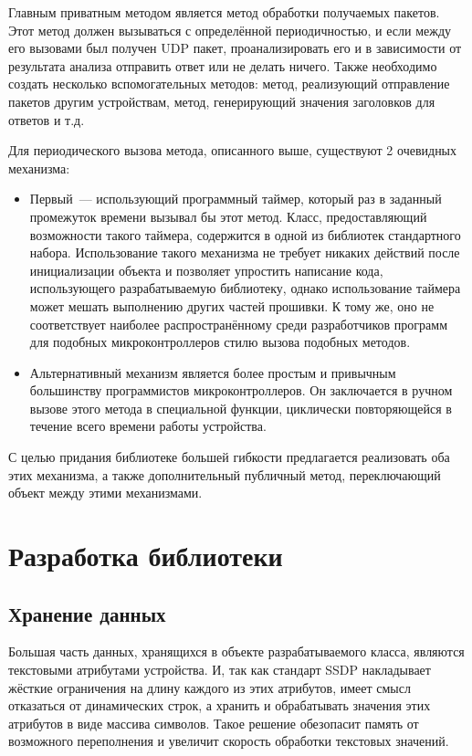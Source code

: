Главным приватным методом является метод обработки получаемых пакетов.
Этот метод должен вызываться с определённой периодичностью, и если между его вызовами был получен UDP пакет, проанализировать его и в зависимости от результата анализа отправить ответ или не делать ничего.
Также необходимо создать несколько вспомогательных методов: метод, реализующий отправление пакетов другим устройствам, метод, генерирующий значения заголовков для ответов и т.д.

Для периодического вызова метода, описанного выше, существуют 2 очевидных механизма:

\begin{itemize}
	\item Первый~--- использующий программный таймер, который раз в заданный промежуток времени вызывал бы этот метод.
	Класс, предоставляющий возможности такого таймера, содержится в одной из библиотек стандартного набора.
	Использование такого механизма не требует никаких действий после инициализации объекта и позволяет упростить написание кода, использующего разрабатываемую библиотеку, однако использование таймера может мешать выполнению других частей прошивки.
	К тому же, оно не соответствует наиболее распространённому среди разработчиков программ для подобных микроконтроллеров стилю вызова подобных методов.
	\item Альтернативный механизм является более простым и привычным большинству программистов микроконтроллеров.
Он заключается в ручном вызове этого метода в специальной функции, циклически повторяющейся в течение всего времени работы устройства.
\end{itemize}

С целью придания библиотеке большей гибкости предлагается реализовать оба этих механизма, а также дополнительный публичный метод, переключающий объект между этими механизмами.

\section{Разработка библиотеки}

\subsection{Хранение данных}
Большая часть данных, хранящихся в объекте разрабатываемого класса, являются текстовыми атрибутами устройства.
И, так как стандарт SSDP накладывает жёсткие ограничения на длину каждого из этих атрибутов, имеет смысл отказаться от динамических строк, а хранить и обрабатывать значения этих атрибутов в виде массива символов.
Такое решение обезопасит память от возможного переполнения и увеличит скорость обработки текстовых значений.


